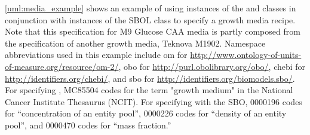  \ref{uml:media_example} shows an example of using instances of the  and  classes in conjunction with instances of the SBOL  class to specify a growth media recipe. Note that this specification for M9 Glucose CAA media is partly composed from the specification of another growth media, Teknova M1902. Namespace abbreviations used in this example include om for \url{http://www.ontology-of-units-of-measure.org/resource/om-2/}, obo for \url{http://purl.obolibrary.org/obo/}, chebi for \url{http://identifiers.org/chebi/}, and sbo for \url{http://identifiers.org/biomodels.sbo/}. For specifying  , MC85504 codes for the term "growth medium" in the National Cancer Institute Thesaurus (NCIT). For specifying   with the SBO, 0000196 codes for ``concentration of an entity pool'', 0000226 codes for ``density of an entity pool'', and 0000470 codes for ``mass fraction.''